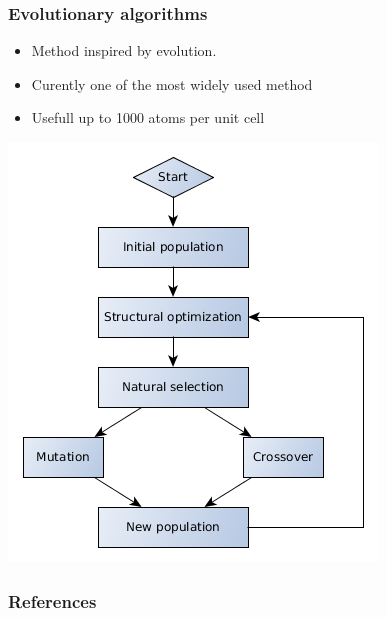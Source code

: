 \documentclass{beamer}
\begin{document}
\begin{frame}
  \frametitle{Evolutionary algorithms}
  \begin{minipage}[h]{0.49\textwidth}
    \begin{itemize}
      \item Method inspired by evolution.
      \item Curently one of the most widely used method
      \item Usefull up to 1000 atoms per unit cell
    \end{itemize}
  \end{minipage}%
  \hfill%
  \begin{minipage}[h]{0.49\textwidth}
    \includegraphics[width=\textwidth]{figs/EA.png}
  \end{minipage}
\end{frame}

\begin{frame}
  \frametitle{References}
  \printbibliography
\end{frame}
\end{document}
